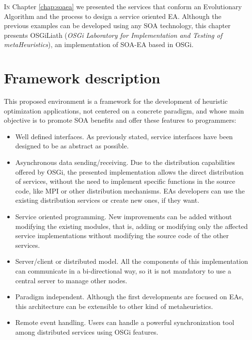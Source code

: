 \label{chap:osgiliath}
\minitoc\mtcskip
\vfill
\lettrine{I}{n} Chapter \ref{chap:soaea} we presented the services that conform an Evolutionary Algorithm and the process to design a service oriented EA. Although the previous examples can be developed using any SOA technology, this chapter presents OSGiLiath ({\em OSGi Laboratory for Implementation and Testing of metaHeuristics}), an implementation of SOA-EA based in OSGi. 

\section{Framework description}
This proposed environment is a  framework for the development of heuristic optimization applications, not centered on a concrete paradigm, and whose main objective is to promote  SOA benefits and offer these features to programmers:


\begin{itemize}
\item Well defined interfaces. As previously stated, service interfaces have been designed to be as abstract as possible.
\item Asynchronous data sending/receiving. Due to the distribution capabilities offered by OSGi, the presented implementation allows the direct distribution of services, without the need to implement specific functions in the source code, like MPI or other distribution mechanisms. EAs developers can use the existing distribution services or create new ones, if they want.
\item Service oriented programming. New improvements can be added without modifying the existing modules, that is, adding or modifying only the affected service implementations without modifying the source code of the other services.
\item Server/client or distributed model. All the components of this implementation can communicate in a bi-directional way, so it is not mandatory to use a central server to manage other nodes.
\item Paradigm independent. Although the first developments are focused on EAs, this architecture can be extensible to other kind of metaheuristics.
\item Remote event handling. Users can handle a
  powerful synchronization tool among distributed services using OSGi features. 
                               
\end{itemize}

